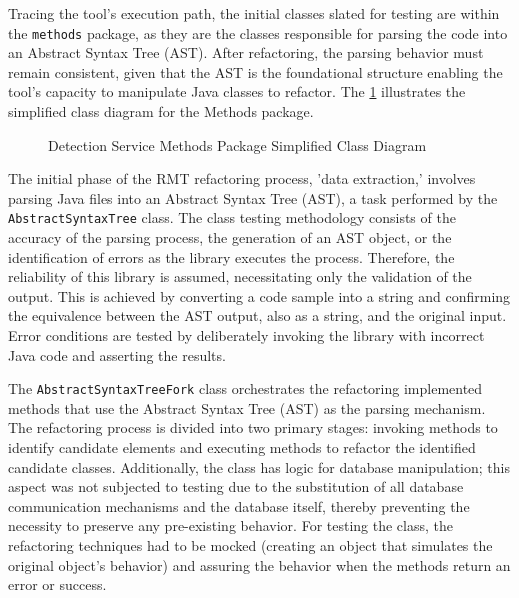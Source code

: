 Tracing the tool's execution path, the initial classes slated for testing are within the \texttt{methods} package, as they are the classes responsible for parsing the code into an Abstract Syntax Tree (AST). After refactoring, the parsing behavior must remain consistent, given that the AST is the foundational structure enabling the tool's capacity to manipulate Java classes to refactor. The \cref{fig-class-detection-methods} illustrates the simplified class diagram for the Methods package.

\begin{figure}[ht!]
\SetCaptionWidth{\textwidth}
\caption{Detection Service Methods Package Simplified Class Diagram}
\label{fig-class-detection-methods}
\fontsize{7}{8}\selectfont

\end{figure}
\FloatBarrier

The initial phase of the RMT refactoring process, 'data extraction,' involves parsing Java files into an Abstract Syntax Tree (AST), a task performed by the \texttt{AbstractSyntaxTree} class. The class testing methodology consists of the accuracy of the parsing process, the generation of an AST object, or the identification of errors as the library \cite{javaparser} executes the process. Therefore, the reliability of this library is assumed, necessitating only the validation of the output. This is achieved by converting a code sample into a string and confirming the equivalence between the AST output, also as a string, and the original input. Error conditions are tested by deliberately invoking the library with incorrect Java code and asserting the results.

The \texttt{AbstractSyntaxTreeFork} class orchestrates the refactoring implemented methods that use the Abstract Syntax Tree (AST) as the parsing mechanism. The refactoring process is divided into two primary stages: invoking methods to identify candidate elements and executing methods to refactor the identified candidate classes. Additionally, the class has logic for database manipulation; this aspect was not subjected to testing due to the substitution of all database communication mechanisms and the database itself, thereby preventing the necessity to preserve any pre-existing behavior. For testing the class, the refactoring techniques had to be mocked (creating an object that simulates the original object's behavior) and assuring the behavior when the methods return an error or success.

